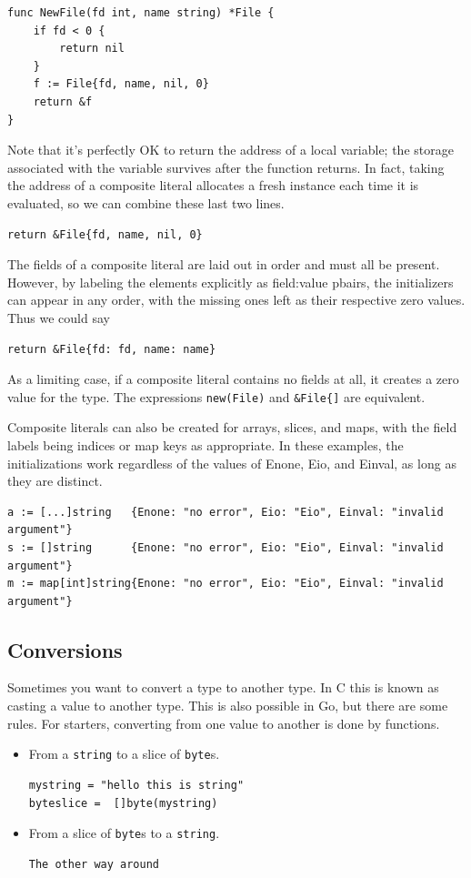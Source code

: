 \begin{lstlisting}
func NewFile(fd int, name string) *File {
    if fd < 0 {
        return nil
    }
    f := File{fd, name, nil, 0}
    return &f
}
\end{lstlisting}
Note that it's perfectly OK to return the address of a local variable;
the storage associated with the variable survives after the function
returns. In fact, taking the address of a composite literal allocates a
fresh instance each time it is evaluated, so we can combine these last
two lines.

\begin{lstlisting}
return &File{fd, name, nil, 0}
\end{lstlisting}
The fields of a composite literal are laid out in order and must all be
present. However, by labeling the elements explicitly as field:value
pbairs, the initializers can appear in any order, with the missing ones
left as their respective zero values. Thus we could say

\begin{lstlisting}
return &File{fd: fd, name: name}
\end{lstlisting}
As a limiting case, if a composite literal contains no fields at all, it
creates a zero value for the type. The expressions
\lstinline{new(File)} and 
\lstinline|&File{]| are equivalent.

Composite literals can also be created for arrays, slices, and maps,
with the field labels being indices or map keys as appropriate. In these
examples, the initializations work regardless of the values of Enone,
Eio, and Einval, as long as they are distinct.
\begin{lstlisting}
a := [...]string   {Enone: "no error", Eio: "Eio", Einval: "invalid argument"}
s := []string      {Enone: "no error", Eio: "Eio", Einval: "invalid argument"}
m := map[int]string{Enone: "no error", Eio: "Eio", Einval: "invalid argument"}
\end{lstlisting}

\subsection{Conversions}
\label{sec:conversions}
Sometimes you want to convert a type to another type. In C this is known
as casting a value to another type. This is also possible in Go, but
there are some rules. For starters, converting from one value to another
is done by functions. 
\begin{itemize}
\item{
From a \lstinline{string} to a slice of \lstinline{byte}s.
\begin{lstlisting}
mystring = "hello this is string"
byteslice =  []byte(mystring)
\end{lstlisting}
}
\item{
From a slice of \lstinline{byte}s to a \lstinline{string}.
\begin{lstlisting}
The other way around
\end{lstlisting}
}
\end{itemize}

